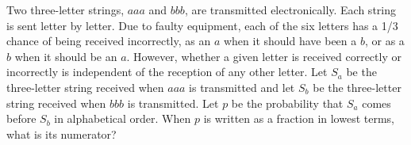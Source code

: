 Two three-letter strings, $aaa$ and $bbb$, are transmitted electronically. Each string is sent letter by letter. Due to faulty equipment, each of the six letters has a 1/3 chance of being received incorrectly, as an $a$ when it should have been a $b$, or as a $b$ when it should be an $a$. However, whether a given letter is received correctly or incorrectly is independent of the reception of any other letter. Let $S_a$ be the three-letter string received when $aaa$ is transmitted and let $S_b$ be the three-letter string received when $bbb$ is transmitted. Let $p$ be the probability that $S_a$ comes before $S_b$ in alphabetical order. When $p$ is written as a fraction in lowest terms, what is its numerator?